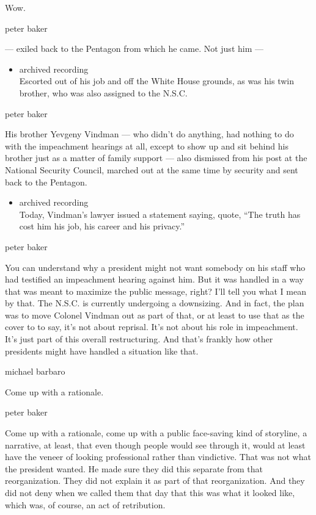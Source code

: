 Wow.

peter baker

--- exiled back to the Pentagon from which he came. Not just him ---

\begin{itemize}
\tightlist
\item
  archived recording\\
  Escorted out of his job and off the White House grounds, as was his
  twin brother, who was also assigned to the N.S.C.
\end{itemize}

peter baker

His brother Yevgeny Vindman --- who didn't do anything, had nothing to
do with the impeachment hearings at all, except to show up and sit
behind his brother just as a matter of family support --- also dismissed
from his post at the National Security Council, marched out at the same
time by security and sent back to the Pentagon.

\begin{itemize}
\tightlist
\item
  archived recording\\
  Today, Vindman's lawyer issued a statement saying, quote, ``The truth
  has cost him his job, his career and his privacy.''
\end{itemize}

peter baker

You can understand why a president might not want somebody on his staff
who had testified an impeachment hearing against him. But it was handled
in a way that was meant to maximize the public message, right? I'll tell
you what I mean by that. The N.S.C. is currently undergoing a
downsizing. And in fact, the plan was to move Colonel Vindman out as
part of that, or at least to use that as the cover to to say, it's not
about reprisal. It's not about his role in impeachment. It's just part
of this overall restructuring. And that's frankly how other presidents
might have handled a situation like that.

michael barbaro

Come up with a rationale.

peter baker

Come up with a rationale, come up with a public face-saving kind of
storyline, a narrative, at least, that even though people would see
through it, would at least have the veneer of looking professional
rather than vindictive. That was not what the president wanted. He made
sure they did this separate from that reorganization. They did not
explain it as part of that reorganization. And they did not deny when we
called them that day that this was what it looked like, which was, of
course, an act of retribution.

